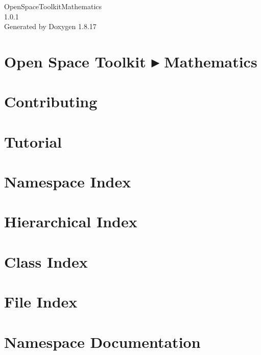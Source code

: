 \let\mypdfximage\pdfximage\def\pdfximage{\immediate\mypdfximage}\documentclass[twoside]{book}
\newcommand{\+}{\discretionary{\mbox{\scriptsize$\hookleftarrow$}}{}{}}
\newcommand{\clearemptydoublepage}{%
  \newpage{\pagestyle{empty}\cleardoublepage}%
}
\begin{document}
\hypersetup{pageanchor=false,
             bookmarksnumbered=true,
             pdfencoding=unicode
            }
\begin{titlepage}
\vspace*{7cm}
\begin{center}%
{\Large Open\+Space\+Toolkit\+Mathematics \\[1ex]\large 1.\+0.\+1 }\\
\vspace*{1cm}
{\large Generated by Doxygen 1.8.17}\\
\end{center}
\end{titlepage}
\clearemptydoublepage
{}
\tableofcontents
\clearemptydoublepage
{}
\hypersetup{pageanchor=true}

\chapter{Open Space Toolkit ▸ Mathematics}
\label{index}\hypertarget{index}{}
\chapter{Contributing}
\label{md__c_o_n_t_r_i_b_u_t_i_n_g}

\chapter{Tutorial}
\label{md_docs__tutorial}

\chapter{Namespace Index}

\chapter{Hierarchical Index}

\chapter{Class Index}

\chapter{File Index}

\chapter{Namespace Documentation}













\end{document}
